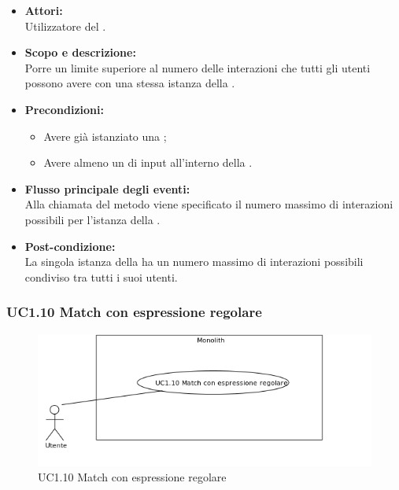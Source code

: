 \begin{itemize}
	\item \textbf{Attori:}
	\\Utilizzatore del .
	\item \textbf{Scopo e descrizione:} 
	\\Porre un limite superiore al numero delle interazioni che tutti gli utenti possono avere con una stessa istanza della .
	\item \textbf{Precondizioni:}
	\begin{itemize}
		\item Avere già istanziato una ;
		\item Avere almeno un  di input all'interno della .
	\end{itemize}
	\item \textbf{Flusso principale degli eventi:}
	\\Alla chiamata del metodo viene specificato il numero massimo di interazioni possibili per l'istanza della .
	\item \textbf{Post-condizione:}
	\\La singola istanza della  ha un numero massimo di interazioni possibili condiviso tra tutti i suoi utenti. 
\end{itemize}

\subsubsection{UC1.10 Match con espressione regolare} \label{UC1.10}

\begin{figure}[H]
	\centering
	\includegraphics[width=15cm]{../../documenti/AnalisiDeiRequisiti/Diagrammi_img/uc1_10.png}
	\caption{UC1.10 Match con espressione regolare}
\end{figure}

